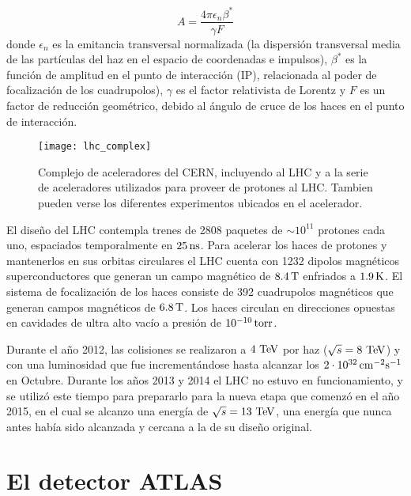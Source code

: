 \begin{equation}
  A = \frac{4\pi \epsilon_n \beta^{*}}{\gamma F}
\end{equation}
%
donde $\epsilon_n$ es la emitancia transversal normalizada (la dispersión
transversal media de las partículas del haz en el espacio de coordenadas e
impulsos), $\beta^{*}$ es la función de amplitud en el punto de interacción
(IP), relacionada al poder de focalización de los cuadrupolos), $\gamma$ es el
factor relativista de Lorentz y $F$ es un factor de reducción geométrico, debido
al ángulo de cruce de los haces en el punto de interacción.

\begin{figure}[!htbp]
  \centering

  \texttt{[image: lhc\_complex]}

  \caption{Complejo de aceleradores del CERN, incluyendo al LHC y a la serie
    de aceleradores utilizados para proveer de protones al LHC. Tambien pueden verse
    los diferentes experimentos ubicados en el acelerador.}
  \label{fig:lhc_complex}

\end{figure}

El diseño del LHC contempla trenes de 2808 paquetes de $\sim 10^{11}$ protones cada uno,
espaciados temporalmente en $\unit[25]{ns}$.
Para acelerar los haces de protones y mantenerlos en sus orbitas circulares el
LHC cuenta con 1232 dipolos magnéticos superconductores que generan un campo
magnético de $\unit[8.4]{T}$ enfriados a $\unit[1.9]{K}$. El sistema de focalización de los haces
consiste de 392 cuadrupolos magnéticos que generan campos magnéticos de $\unit[6.8]{T}$.
Los haces circulan en direcciones opuestas en cavidades de ultra alto vacío
a presión de $\unit[10^{-10}]{torr}$.

Durante el año 2012, las colisiones se realizaron a $4\TeV$ por haz ($\sqrt{s} =
8 \TeV$) y con una luminosidad que fue incrementándose hasta alcanzar los
$\unit[2 \cdot 10^{32}]{cm^{-2}s^{-1}}$ en Octubre. Durante los a\~nos 2013 y 2014
el LHC no estuvo en funcionamiento, y se utilizó este tiempo para prepararlo para
la nueva etapa que comenzó en el a\~no 2015, en el cual se alcanzo una energía de $\sqrt{s} = 13 \tev$,
una energía que nunca antes había sido alcanzada y cercana a la de su diseño
original.




\section{El detector ATLAS}

